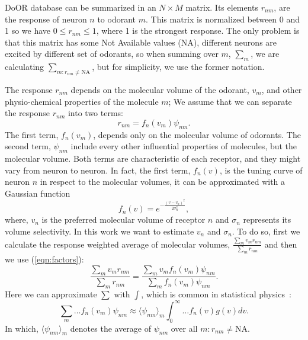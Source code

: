 \documentclass[11pt]{paper} %
\begin{document}
DoOR database can be summarized in an $N\times M$ matrix. 
Its elements $r_{nm}$, are the response of neuron $n$ to odorant $m$. 
This matrix is normalized between 0 and 1 so we have $0 \le r_{nm} \le 1$, where 1 is the strongest response.
The only problem is that this matrix has some Not Available values (NA), 
different neurons are excited by different set of odorants, 
so  when summing over $m$, $\sum_m$, we are calculating $\sum_{m: r_{nm} \neq \text{NA}}$, but for simplicity, 
we use the former notation. 

The response $r_{nm}$ depends on the molecular volume of the odorant, $v_m$, 
and other physio-chemical properties of the molecule $m$; 
We assume that we can separate the response $r_{nm}$ into two terms:
\begin{equation}
	r_{nm} = f_n(v_m) \psi_{nm}.
	\label{eqn:factors}
\end{equation}
The first term, $f_n(v_m)$, depends only on the molecular volume of odorants.
The second term, $\psi_{nm}$ include every other influential properties of molecules, but the molecular volume.
Both terms are characteristic of each receptor, and they might vary from neuron to neuron.
In fact, the first term, $f_n(v)$, is the tuning curve of neuron $n$ in respect to the molecular volumes, 
it can be approximated with a Gaussian function
\begin{equation}
	\displaystyle f_n(v) = e^{-\frac{(v-v_n)^2}{2\sigma^2_n}}, 
	\label{eqn:volume-dependence}
\end{equation}
where, $v_n$ is the preferred molecular volume of receptor $n$ and $\sigma_n$ represents its volume selectivity. 
In this work we want to estimate $v_n$ and $\sigma_n$. 
To do so, first we calculate the response weighted average of molecular volumes, 
$\frac{\sum_{m} v_m r_{nm}}{\sum_{m} r_{nm}}$ and then we use (\ref{eqn:factors}):
\begin{equation}
	\frac{\displaystyle \sum_{m} v_m r_{nm}}{\displaystyle \sum_{m} r_{nm}} = \frac{\displaystyle \sum_{m} v_m f_n(v_m) \psi_{nm}}{\displaystyle \sum_{m} f_n(v_m) \psi_{nm}}.
	\label{eqn:sta}
\end{equation}
Here we can approximate $\sum$ with $\int$, which is common in statistical physics~\cite{}:
\begin{equation}
	\sum_{m} \dots f_n(v_m) \psi_{nm} \approx  \langle \psi_{nm} \rangle_m \int_0^\infty \dots f_n(v) g(v)  dv. 
	\label{eqn:sigma_to_int}
\end{equation}
In which, 
$\langle \psi_{nm} \rangle_m$ denotes the average of $\psi_{nm}$ over all $m: r_{nm} \neq \text{NA}$. 
\end{document}
